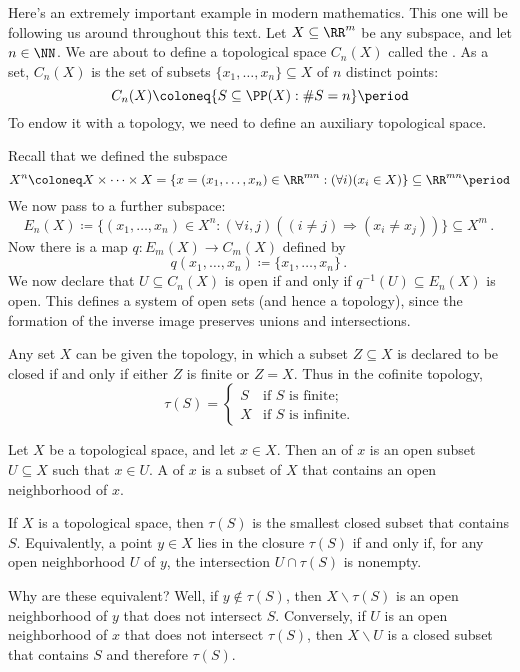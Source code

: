 \begin{exm}
	Here's an extremely important example in modern mathematics.
	This one will be following us around throughout this text.
	Let $X \subseteq \RR^m$ be any subspace, and let $n \in \NN$.
	We are about to define a topological space $C_n(X)$ called the .
	As a set, $C_n(X)$ is the set of subsets $\{x_1,\dots,x_n\} \subseteq X$ of $n$ distinct points:
	\[
		C_n(X) \coloneq \{ S \subseteq \PP(X) : \# S = n \} \period
	\]
	To endow it with a topology, we need to define an auxiliary topological space.

	Recall that we defined the subspace
	\[
		X^n \coloneq X \times \cdots \times X = \{ x = (x_1, \dots, x_n) \in \RR^{mn} : (\forall i)(x_i \in X) \} \subseteq \RR^{mn} \period
	\]
	We now pass to a further subspace:
	\[
		E_n(X) \coloneq \{(x_1, \dots, x_n) \in X^n : (\forall i,j)((i \neq j) ⇒ (x_i \neq x_j)) \} \subseteq X^m \period
	\]
	Now there is a map $q \colon  E_m(X) \to C_m(X)$ defined by
	\[
		q(x_1, \dots, x_n) \coloneq \{x_1, \dots, x_n\} \period
	\]
	We now declare that $U \subseteq C_n(X)$ is open if and only if $q^{-1}(U) \subseteq E_n(X) $ is open.
	This defines a system of open sets (and hence a topology), since the formation of the inverse image preserves unions and intersections.
\end{exm}

\begin{exm} Any set $X$ can be given the  topology, in which a subset $Z\subseteq X$ is declared to be closed if and only if either $Z$ is finite or $Z=X$.
	Thus in the cofinite topology,
	\[
		\tau(S) = \begin{cases}
			S & \text{if } S \text{ is finite;} \\
			X & \text{if } S \text{ is infinite.}
		\end{cases}
	\]
\end{exm}

\begin{dfn}
	Let $X$ be a topological space, and let $x \in X$.
	Then an  of $x$ is an open subset $U \subseteq X $ such that $x \in U$.
	A  of $x$ is a subset of $X$ that contains an open neighborhood of $x$.
\end{dfn}

\begin{nul}
	If $X$ is a topological space, then $\tau(S)$ is the smallest closed subset that contains $S$.
	Equivalently, a point $y \in X$ lies in the closure $\tau(S)$ if and only if, for any open neighborhood $U$ of $y$, the intersection $U \cap \tau(S)$ is nonempty.

	Why are these equivalent?
	Well, if $y \notin \tau(S)$, then $X \smallsetminus \tau(S)$ is an open neighborhood of $y$ that does not intersect $S$.
	Conversely, if $U$ is an open neighborhood of $x$ that does not intersect $ \tau(S) $, then $X \smallsetminus U$ is a closed subset that contains $S$ and therefore $\tau(S)$.
\end{nul}
